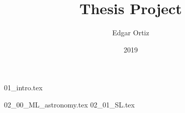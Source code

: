 \documentclass[12pt]{extarticle}
\title{Thesis Project}
\author{Edgar Ortiz}
\date{2019}
\begin{document}
\maketitle

{01_intro.tex}

\newpage

{02_00_ML_astronomy.tex}
    {02_01_SL.tex}
\newpage


\end{document}
